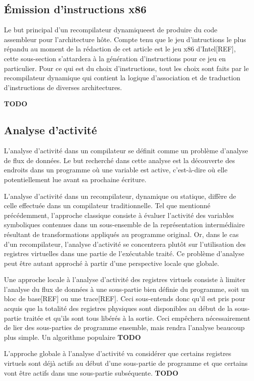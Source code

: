 \documentclass{article} %
\begin{document}
\subsection{Émission d'instructions x86}
Le but principal d'un recompilateur dynamiqueest de produire du code assembleur pour l'architecture hôte. Compte tenu que le jeu d'intructions le plus répandu au moment de la rédaction de cet article est le jeu x86 d'Intel[REF], cette sous-section s'attardera à la génération d'instructions pour ce jeu en particulier. Pour ce qui est du choix d'instructions, tout les choix sont faits par le recompilateur dynamique qui contient la logique d'association et de traduction d'instructions de diverses architectures.

\textbf{TODO}

\subsection{Analyse d'activité}
L'analyse d'activité dans un compilateur se définit comme un problème d'analyse de flux de données. Le but recherché dans cette analyse est la découverte des endroits dans un programme où une variable est active, c'est-à-dire où elle potentiellement lue avant sa prochaine écriture.

L'analyse d'activité dans un recompilateur, dynamique ou statique, diffère de celle effectuée dans un compilateur traditionnelle. Tel que mentionné précédemment, l'approche classique consiste à évaluer l'activité des variables symboliques contenues dans un sous-ensemble de la représentation intermédiaire résultant de transformations appliqués au programme original. Or, dans le cas d'un recompilateur, l'analyse d'activité se concentrera plutôt sur l'utilisation des registres virtuelles dans une partie de l'exécutable traité. Ce problème d'analyse peut être autant approché à partir d'une perspective locale que globale.

Une approche locale à l'analyse d'activité des registres virtuels consiste à limiter l'analyse du flux de données à une sous-partie bien définie du programme, soit un bloc de base[REF] ou une trace[REF]. Ceci sous-entends donc qu'il est pris pour acquis que la totalité des registres physiques sont disponibles au début de la sous-partie traitée et qu'ils sont tous libérés à la sortie. Ceci empêchera nécessairement de lier des sous-parties de programme ensemble, mais rendra l'analyse beaucoup plus simple. Un algorithme populaire \textbf{TODO}

L'approche globale à l'analyse d'activité va considérer que certains registres virtuels sont déjà actifs au début d'une sous-partie de programme et que certains vont être actifs dans une sous-partie subséquente. \textbf{TODO}
\end{document}
